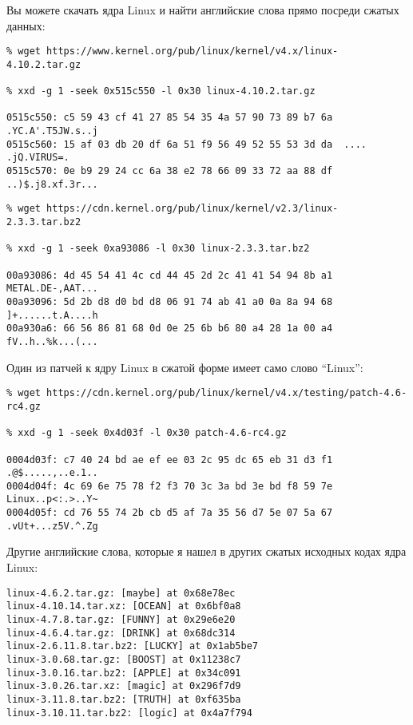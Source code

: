 
Вы можете скачать ядра Linux и найти английские слова прямо посреди сжатых данных:

\begin{lstlisting}
% wget https://www.kernel.org/pub/linux/kernel/v4.x/linux-4.10.2.tar.gz

% xxd -g 1 -seek 0x515c550 -l 0x30 linux-4.10.2.tar.gz

0515c550: c5 59 43 cf 41 27 85 54 35 4a 57 90 73 89 b7 6a  .YC.A'.T5JW.s..j
0515c560: 15 af 03 db 20 df 6a 51 f9 56 49 52 55 53 3d da  .... .jQ.VIRUS=.
0515c570: 0e b9 29 24 cc 6a 38 e2 78 66 09 33 72 aa 88 df  ..)$.j8.xf.3r...
\end{lstlisting}

\begin{lstlisting}
% wget https://cdn.kernel.org/pub/linux/kernel/v2.3/linux-2.3.3.tar.bz2

% xxd -g 1 -seek 0xa93086 -l 0x30 linux-2.3.3.tar.bz2

00a93086: 4d 45 54 41 4c cd 44 45 2d 2c 41 41 54 94 8b a1  METAL.DE-,AAT...
00a93096: 5d 2b d8 d0 bd d8 06 91 74 ab 41 a0 0a 8a 94 68  ]+......t.A....h
00a930a6: 66 56 86 81 68 0d 0e 25 6b b6 80 a4 28 1a 00 a4  fV..h..%k...(...
\end{lstlisting}

Один из патчей к ядру Linux в сжатой форме имеет само слово ``Linux'':

\begin{lstlisting}
% wget https://cdn.kernel.org/pub/linux/kernel/v4.x/testing/patch-4.6-rc4.gz

% xxd -g 1 -seek 0x4d03f -l 0x30 patch-4.6-rc4.gz

0004d03f: c7 40 24 bd ae ef ee 03 2c 95 dc 65 eb 31 d3 f1  .@$.....,..e.1..
0004d04f: 4c 69 6e 75 78 f2 f3 70 3c 3a bd 3e bd f8 59 7e  Linux..p<:.>..Y~
0004d05f: cd 76 55 74 2b cb d5 af 7a 35 56 d7 5e 07 5a 67  .vUt+...z5V.^.Zg
\end{lstlisting}

Другие английские слова, которые я нашел в других сжатых исходных кодах ядра Linux:

\begin{lstlisting}
linux-4.6.2.tar.gz: [maybe] at 0x68e78ec
linux-4.10.14.tar.xz: [OCEAN] at 0x6bf0a8
linux-4.7.8.tar.gz: [FUNNY] at 0x29e6e20
linux-4.6.4.tar.gz: [DRINK] at 0x68dc314
linux-2.6.11.8.tar.bz2: [LUCKY] at 0x1ab5be7
linux-3.0.68.tar.gz: [BOOST] at 0x11238c7
linux-3.0.16.tar.bz2: [APPLE] at 0x34c091
linux-3.0.26.tar.xz: [magic] at 0x296f7d9
linux-3.11.8.tar.bz2: [TRUTH] at 0xf635ba
linux-3.10.11.tar.bz2: [logic] at 0x4a7f794
\end{lstlisting}

